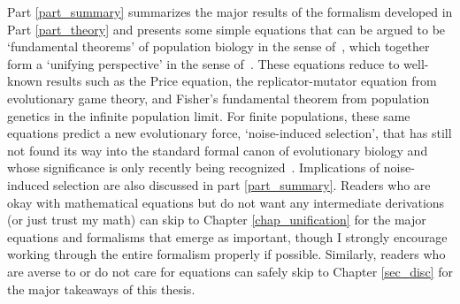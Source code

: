 Part \ref{part_summary} summarizes the major results of the formalism developed in Part \ref{part_theory} and presents some simple equations that can be argued to be `fundamental theorems' of population biology in the sense of~\cite{queller_fundamental_2017}, which together form a `unifying perspective' in the sense of~\cite{lion_theoretical_2018}. These equations reduce to well-known results such as the Price equation, the replicator-mutator equation from evolutionary game theory, and Fisher's fundamental theorem from population genetics in the infinite population limit. For finite populations, these same equations predict a new evolutionary force, `noise-induced selection', that has still not found its way into the standard formal canon of evolutionary biology and whose significance is only recently being recognized~\citep{constable_demographic_2016,mcleod_social_2019,mazzolini_universality_2022, kuosmanen_turnover_2022}. Implications of noise-induced selection are also discussed in part \ref{part_summary}. Readers who are okay with mathematical equations but do not want any intermediate derivations (or just trust my math) can skip to Chapter \ref{chap_unification} for the major equations and formalisms that emerge as important, though I strongly encourage working through the entire formalism properly if possible. Similarly, readers who are averse to or do not care for equations can safely skip to Chapter \ref{sec_disc} for the major takeaways of this thesis.


